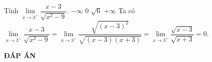 \begin{ex}%
	Tính $\lim \limits_{x \to 3^+} \dfrac{x-3}{\sqrt{x^2-9}}$.
	\choice
		{$-\infty$}
		{\True $0$}
		{$\sqrt{6}$}
		{$+\infty$}
	\loigiai
		{
			Ta có $\lim \limits_{x \to 3^+} \dfrac{x-3}{\sqrt{x^2-9}} = \lim \limits_{x \to 3^+} \dfrac{\sqrt{(x-3)^2}}{\sqrt{(x-3)(x+3)}} = \lim \limits_{x \to 3^+} \dfrac{\sqrt{x-3}}{\sqrt{x+3}} = 0$.
		}
\end{ex}

\newpage
\begin{center}
	\textbf{ĐÁP ÁN}
\end{center}
\begin{multicols}{10}
	 
\end{multicols}
